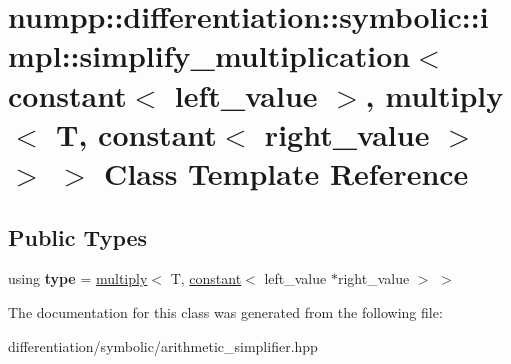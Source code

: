 \hypertarget{classnumpp_1_1differentiation_1_1symbolic_1_1impl_1_1simplify__multiplication_3_01constant_3_01ld8b2feb223452c4aaaf6eb83932601c0}{}\section{numpp\+:\+:differentiation\+:\+:symbolic\+:\+:impl\+:\+:simplify\+\_\+multiplication$<$ constant$<$ left\+\_\+value $>$, multiply$<$ T, constant$<$ right\+\_\+value $>$ $>$ $>$ Class Template Reference}
\label{classnumpp_1_1differentiation_1_1symbolic_1_1impl_1_1simplify__multiplication_3_01constant_3_01ld8b2feb223452c4aaaf6eb83932601c0}
\subsection*{Public Types}
\begin{DoxyCompactItemize}
\item 
\mbox{\label{classnumpp_1_1differentiation_1_1symbolic_1_1impl_1_1simplify__multiplication_3_01constant_3_01ld8b2feb223452c4aaaf6eb83932601c0_ae4974f0ea7631f297e39660b6fd9d87e}} 
using {\bfseries type} = \hyperlink{classnumpp_1_1differentiation_1_1symbolic_1_1multiply}{multiply}$<$ T, \hyperlink{classnumpp_1_1differentiation_1_1symbolic_1_1constant}{constant}$<$ left\+\_\+value $\ast$right\+\_\+value $>$ $>$
\end{DoxyCompactItemize}


The documentation for this class was generated from the following file\+:\begin{DoxyCompactItemize}
\item 
differentiation/symbolic/arithmetic\+\_\+simplifier.\+hpp\end{DoxyCompactItemize}
